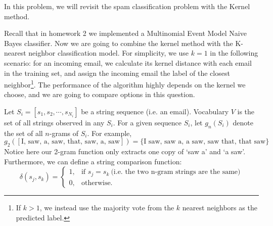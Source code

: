 \documentclass{article}
\begin{document}
In this problem, we will revisit the spam classification problem with the Kernel method. 

Recall that in homework 2 we implemented a Multinomial Event Model Naive Bayes classifier. Now we are going to combine the kernel method with the  K-nearest neighbor classification model. For simplicity, we use $k=1$ in the following scenario: for an incoming email, we calculate its kernel distance with each email in the training set, and assign the incoming email the label of the closest neighbor\footnote{If $k > 1$, we instead use the majority vote from the $k$ nearest neighbors as the predicted label.}. The performance of the algorithm highly depends on the kernel we choose, and we are going to compare options in this question.  

Let $S_i = [s_1, s_2, \cdots, s_{N_i}]$ be a string sequence (i.e. an email). Vocabulary $V$ is the set of all strings observed in any $S_i$. For a given sequence $S_i$, let $g_n(S_i)$ denote the set of all $n$-grams of $S_i$. For example,
    $$
        g_2([\text{I, saw, a, saw, that, saw, a, saw} ]) = \{\text{I saw},\,\text{saw a},\,\text{a saw},\,\text{saw that},\,\text{that saw}\}
    $$
    Notice here our 2-gram function only extracts one copy of `saw a' and `a saw'. Furthermore, we can define a string comparison function: 
\[
    \delta(s_j, s_k) =
\begin{cases}
  1,& \text{if } s_j = s_k\ \text{(i.e. the two n-gram strings are the same)}\\
    0,& \text{otherwise.}
\end{cases}
\]
\end{document}
